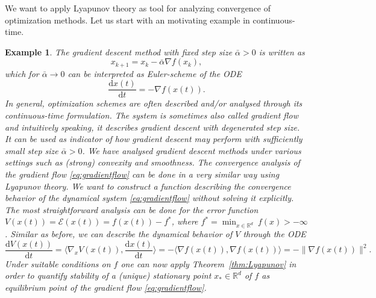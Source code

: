 \documentclass[12pt,openany]{book}
\newtheorem{example}[thm]{Example}
\theoremstyle{definition}
\theoremstyle{definition}
\newcommand{\R}{\mathbb{R}}
\newcommand{\dd}{{\mathrm{d}}}
\begin{document}
We want to apply Lyapunov theory as tool for analyzing convergence of optimization  methods. Let us start with an motivating example in continuous-time. 
\begin{example}
The gradient descent method with fixed step size $\bar\alpha>0$ is written as
\[x_{k+1} = x_k - \bar\alpha \nabla f(x_k), \]
which for $\bar\alpha\to0$ can be interpreted as Euler-scheme of the ODE
\begin{equation}\label{eq:gradientflow}
\frac{\dd x(t)}{\dd t} = -\nabla f(x(t)).
\end{equation}
In general, optimization schemes are often described and/or analysed through its continuous-time formulation. The system is sometimes also called \textit{gradient flow} and intuitively speaking, it describes gradient descent with degenerated step size.  It can be used as indicator of how gradient descent may perform with sufficiently small step size $\bar\alpha>0$. We have analysed gradient descent methods under various settings such as (strong) convexity and smoothness. The convergence analysis of the gradient flow \eqref{eq:gradientflow} can be done in a very similar way using Lyapunov theory.  We want to construct a function describing the convergence behavior of the dynamical system \eqref{eq:gradientflow} without solving it explicitly.  The most straightforward analysis can be done for the error function 
$V(x(t)) = \mathcal E(x(t)) = f(x(t))- f^\ast$, where $f^\ast = \min_{x\in\R^d}\ f(x)>-\infty$. Similar as before, we can describe the dynamical behavior of $V$ through the ODE
\[\frac{\dd V(x(t))}{\dd t} = \langle \nabla_x V(x(t)), \frac{\dd x(t)}{\dd t}\rangle = -\langle \nabla f(x(t)), \nabla f(x(t))\rangle = -\|\nabla f(x(t))\|^2. \]
Under suitable conditions on $f$ one can now apply Theorem~\ref{thm:Lyapunov} in order to quantify stability of a (unique) stationary point $x_\ast\in\R^d$ of $f$ as equilibrium point of the gradient flow \eqref{eq:gradientflow}.
\end{example}
\end{document}
